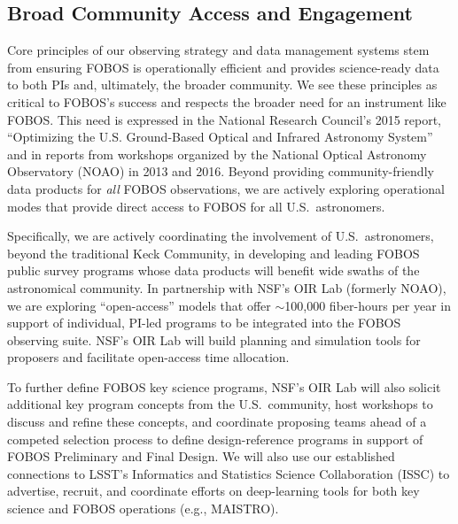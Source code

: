\documentclass[oneside,11pt]{amsart}
\begin{document}
\subsection{Broad Community Access and Engagement}
\label{sec:access}

Core principles of our observing strategy and data management systems
stem from ensuring FOBOS is operationally efficient and provides
science-ready data to both PIs and, ultimately, the broader
community. We see these principles as critical to FOBOS's success and
respects the broader need for an instrument like FOBOS. This need is
expressed in the National Research Council's 2015 report,
``Optimizing the U.S. Ground-Based Optical and Infrared Astronomy
System'' \citep{NAP21722} and in reports from workshops organized by
the National Optical Astronomy Observatory (NOAO) in 2013 and 2016.
Beyond providing community-friendly data products for {\it all} FOBOS
observations, we are actively exploring operational modes that
provide direct access to FOBOS for all U.S.\ astronomers.

Specifically, we are actively coordinating the involvement of U.S.\
astronomers, beyond the traditional Keck Community, in developing and
leading FOBOS public survey programs whose data products will benefit
wide swaths of the astronomical community. In partnership with NSF's
OIR Lab (formerly NOAO), we are exploring ``open-access'' models that
offer $\sim$100,000 fiber-hours per year in support of individual,
PI-led programs to be integrated into the FOBOS observing suite.
NSF's OIR Lab will build planning and simulation tools for proposers
and facilitate open-access time allocation.

To further define FOBOS key science programs, NSF's OIR Lab will also
solicit additional key program concepts from the U.S.\ community,
host workshops to discuss and refine these concepts, and coordinate
proposing teams ahead of a competed selection process to define
design-reference programs in support of FOBOS Preliminary and Final
Design. We will also use our established connections to LSST's
Informatics and Statistics Science Collaboration (ISSC) to advertise,
recruit, and coordinate efforts on deep-learning tools for both key
science and FOBOS operations (e.g., MAISTRO).
\end{document}
